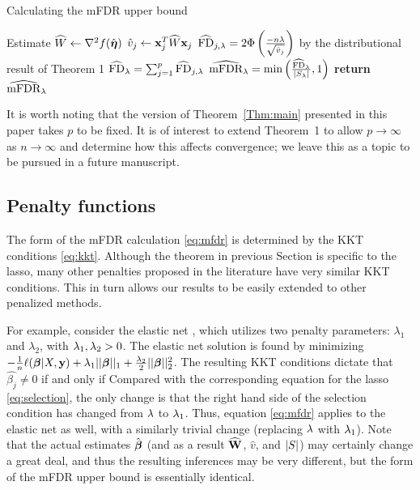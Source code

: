 \begin{algorithm*}
\caption{Calculating the mFDR upper bound}\label{Alg:mfdr}
\begin{algorithmic}[10]
\Procedure{}{}
	\State Estimate $\widehat{W} \gets \nabla^2f(\hat{\boldsymbol{\eta}})$
		\State $\hat{v}_j \gets \mathbf{x}_j^T\widehat{W}\mathbf{x}_j$
		\State $\widehat{\textrm{FD}}_{j, \lambda} = 2 \Phi \left(\frac{-n\lambda}{\sqrt{\hat{v}_j}}\right)$  by the distributional result of Theorem 1
	\EndFor
	\State $\widehat{\textrm{FD}}_\lambda =  \sum_{j=1}^{p} \widehat{\textrm{FD}}_{j, \lambda}$
	\State $\widehat{\textrm{mFDR}}_\lambda = \text{min}\left(\frac{\widehat{\textrm{FD}}_\lambda}{|S_\lambda|}, 1 \right)$
\EndProcedure
\State \textbf{return} $\widehat{\textrm{mFDR}}_\lambda $
\end{algorithmic}
\end{algorithm*}

It is worth noting that the version of Theorem~\ref{Thm:main} presented in this paper takes $p$ to be fixed.  It is of interest to extend Theorem~1 to allow $p \to \infty$ as $n \to \infty$ and determine how this affects convergence; we leave this as a topic to be pursued in a future manuscript.

\subsection{Penalty functions}

The form of the mFDR calculation \eqref{eq:mfdr} is determined by the KKT conditions \eqref{eq:kkt}.  Although the theorem in previous Section is specific to the lasso, many other penalties proposed in the literature have very similar KKT conditions. This in turn allows our results to be easily extended to other penalized methods.

For example, consider the elastic net \citep{Elastic_Net}, which utilizes two penalty parameters: $\lambda_1$ and $\lambda_2$, with $\lambda_1, \lambda_2 >0$. The elastic net solution is found by minimizing $-\frac{1}{n} \ell(\boldsymbol{\beta}|X,\mathbf{y}) + \lambda_1 ||\boldsymbol{\beta}||_1 + \frac{\lambda_2}{2}||\boldsymbol{\beta}||_{2}^2 $. The resulting KKT conditions dictate that $\hat{\beta_j} \neq 0$ if and only if
Compared with the corresponding equation for the lasso \eqref{eq:selection}, the only change is that the right hand side of the selection condition has changed from $\lambda$ to $\lambda_1$.  Thus, equation \eqref{eq:mfdr} applies to the elastic net as well, with a similarly trivial change (replacing $\lambda$ with $\lambda_1$).  Note that the actual estimates $\hat{\boldsymbol{\beta}}$ (and as a result $\widehat{\mathbf{W}}$, $\hat{v}$, and $\left\lvert S\right\rvert$) may certainly change a great deal, and thus the resulting inferences may be very different, but the form of the mFDR upper bound is essentially identical.

